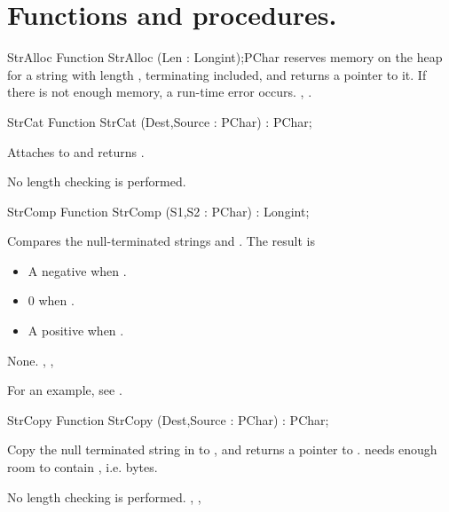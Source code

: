 \section{Functions and procedures.}
\begin{function}{StrAlloc}
\Declaration
Function StrAlloc (Len : Longint);PChar
\Description
{} reserves memory on the heap for a string with length ,
terminating  included, and returns a pointer to it.
\Errors
If there is not enough memory, a run-time error occurs.
\SeeAlso
{}, .
\end{function}
\begin{function}{StrCat}
\Declaration
Function StrCat (Dest,Source : PChar) : PChar;
\Description

Attaches  to  and returns .

\Errors
No length checking is performed.
\SeeAlso
{}
\end{function}
\html{}
\begin{function}{StrComp}
\Declaration
Function StrComp (S1,S2 : PChar) : Longint;

\Description

Compares the null-terminated strings  and .
The result is 
\begin{itemize}
\item A negative  when .
\item 0 when .
\item A positive  when .
\end{itemize}

\Errors
None.
\SeeAlso
{}, , 
\end{function}
For an example, see .
\begin{function}{StrCopy}
\Declaration
Function StrCopy (Dest,Source : PChar) : PChar;

\Description
 
Copy the null terminated string in  to , and
returns a pointer to .  needs enough room to contain
, i.e.  bytes.

\Errors
No length checking is performed.
\SeeAlso
 , , 
\end{function}
